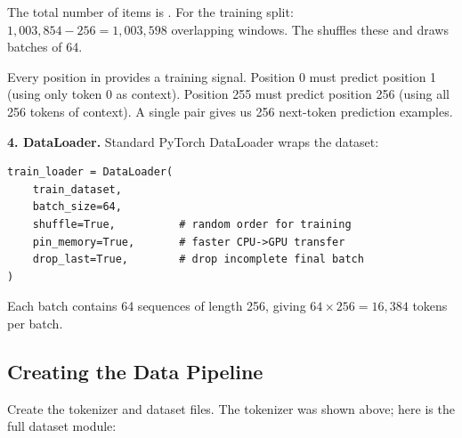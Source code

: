The total number of items is . For the training split: $1{,}003{,}854 - 256 = 1{,}003{,}598$ overlapping windows. The  shuffles these and draws batches of 64.

Every position in  provides a training signal. Position 0 must predict position 1 (using only token 0 as context). Position 255 must predict position 256 (using all 256 tokens of context). A single  pair gives us 256 next-token prediction examples.

\textbf{4. DataLoader.} Standard PyTorch DataLoader wraps the dataset:

\concepttag
\begin{lstlisting}
train_loader = DataLoader(
    train_dataset,
    batch_size=64,
    shuffle=True,          # random order for training
    pin_memory=True,       # faster CPU->GPU transfer
    drop_last=True,        # drop incomplete final batch
)
\end{lstlisting}

Each batch contains 64 sequences of length 256, giving $64 \times 256 = 16{,}384$ tokens per batch.

\subsection{Creating the Data Pipeline}

Create the tokenizer and dataset files. The tokenizer was shown above; here is the full dataset module:

